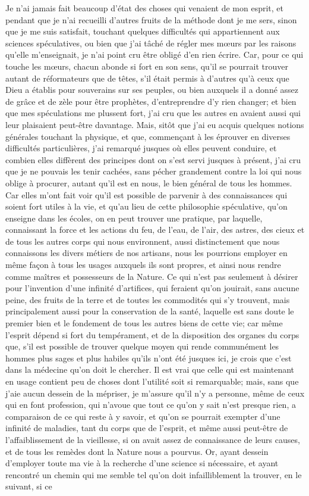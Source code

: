 \documentclass[french,twoside]{book} %
\begin{document}
Je n'ai jamais fait beaucoup d'état des choses qui venaient de mon esprit, et pendant que je n'ai recueilli d'autres fruits de la méthode dont je me sers, sinon que je me suis satisfait, touchant quelques difficultés qui appartiennent aux sciences spéculatives, ou bien que j'ai tâché de régler mes mœurs par les raisons qu'elle m'enseignait, je n'ai point cru être obligé d'en rien écrire. Car, pour ce qui touche les mœurs, chacun abonde si fort en son sens, qu'il se pourrait trouver autant de réformateurs que de têtes, s'il était permis à d'autres qu'à ceux que Dieu a établis pour souverains sur ses peuples, ou bien auxquels il a donné assez de grâce et de zèle pour être prophètes, d'entreprendre d'y rien changer; et bien que mes spéculations me plussent fort, j'ai cru que les autres en avaient aussi qui leur plaisaient peut-être davantage. Mais, sitôt que j'ai eu acquis quelques notions générales touchant la physique, et que, commençant à les éprouver en diverses difficultés particulières, j'ai remarqué jusques où elles peuvent conduire, et combien elles diffèrent des principes dont on s'est servi jusques à présent, j'ai cru que je ne pouvais les tenir cachées, sans pécher grandement contre la loi qui nous oblige à procurer, autant qu'il est en nous, le bien général de tous les hommes. Car elles m'ont fait voir qu'il est possible de parvenir à des connaissances qui soient fort utiles à la vie, et qu'au lieu de cette philosophie spéculative, qu'on enseigne dans les écoles, on en peut trouver une pratique, par laquelle, connaissant la force et les actions du feu, de l'eau, de l'air, des astres, des cieux et de tous les autres corps qui nous environnent, aussi distinctement que nous connaissons les divers métiers de nos artisans, nous les pourrions employer en même façon à tous les usages auxquels ils sont propres, et ainsi nous rendre comme maîtres et possesseurs de la Nature. Ce qui n'est pas seulement à désirer pour l'invention d'une infinité d'artifices, qui feraient qu'on jouirait, sans aucune peine, des fruits de la terre et de toutes les commodités qui s'y trouvent, mais principalement aussi pour la conservation de la santé, laquelle est sans doute le premier bien et le fondement de tous les autres biens de cette vie; car même l'esprit dépend si fort du tempérament, et de la disposition des organes du corps que, s'il est possible de trouver quelque moyen qui rende communément les hommes plus sages et plus habiles qu'ils n'ont été jusques ici, je crois que c'est dans la médecine qu'on doit le chercher. Il est vrai que celle qui est maintenant en usage contient peu de choses dont l'utilité soit si remarquable; mais, sans que j'aie aucun dessein de la mépriser, je m'assure qu'il n'y a personne, même de ceux qui en font profession, qui n'avoue que tout ce qu'on y sait n'est presque rien, a comparaison de ce qui reste à y savoir, et qu'on se pourrait exempter d'une infinité de maladies, tant du corps que de l'esprit, et même aussi peut-être de l'affaiblissement de la vieillesse, si on avait assez de connaissance de leurs causes, et de tous les remèdes dont la Nature nous a pourvus. Or, ayant dessein d'employer toute ma vie à la recherche d'une science si nécessaire, et ayant rencontré un chemin qui me semble tel qu'on doit infailliblement la trouver, en le suivant, si ce 
\end{document}
